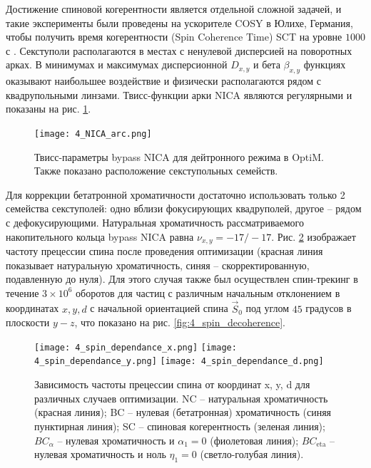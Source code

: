 \par Достижение спиновой когерентности является отдельной сложной задачей, и такие эксперименты были проведены на ускорителе COSY в Юлихе, Германия, чтобы получить время когерентности (Spin Coherence Time) SCT на уровне $1000$ с \cite{1000}. Секступоли располагаются в местах с ненулевой дисперсией на поворотных арках. В минимумах и максимумах дисперсионной $D_{x,y}$ и бета $\beta_{x,y}$ функциях оказывают наибольшее воздействие и физически располагаются рядом с квадрупольными линзами. Твисс-функции арки NICA являются регулярными и показаны на рис. \ref{fig:4_NICA_arc}.

\begin{figure}[!h]
  \centering
   \texttt{[image: 4\_NICA\_arc.png]}
   \caption{Твисс-параметры bypass NICA для дейтронного режима в OptiM. Также показано расположение секступольных семейств.}
   \label{fig:4_NICA_arc}
\end{figure}

\par Для коррекции бетатронной хроматичности достаточно использовать только 2 семейства секступолей: одно вблизи фокусирующих квадруполей, другое – рядом с дефокусирующими. Натуральная хроматичность рассматриваемого накопительного кольца bypass NICA равна $\nu_{x,y}=-17/-17$. Рис. \ref{fig:4_spin_dependance}  изображает частоту прецессии спина после проведения оптимизации (красная линия показывает натуральную хроматичность, синяя – скорректированную, подавленную до нуля). Для этого случая также был осуществлен спин-трекинг в течение $3\times{10}^6$ оборотов для частиц с различным начальным отклонением в координатах $x, y, d$ с начальной ориентацией спина ${\vec{S}}_0$ под углом $45$ градусов в плоскости $y-z$, что показано на рис. \ref{fig:4_spin_decoherence}.

\begin{figure}[!h]
	\centering
	\texttt{[image: 4\_spin\_dependance\_x.png]}
	\texttt{[image: 4\_spin\_dependance\_y.png]}
	\texttt{[image: 4\_spin\_dependance\_d.png]}
	\caption{Зависимость частоты прецессии спина от координат x, y, d для различных случаев оптимизации. NC – натуральная хроматичность (красная линия); BC – нулевая (бетатронная) хроматичность (синяя пунктирная линия); SC – спиновая когерентность (зеленая линия); $BC_{\alpha}$ – нулевая хроматичность и $\alpha_1=0$ (фиолетовая линия); $BC_{\text{eta}}$ – нулевая хроматичность и ноль $\eta_1=0$ (светло-голубая линия).}
	\label{fig:4_spin_dependance}
\end{figure}

